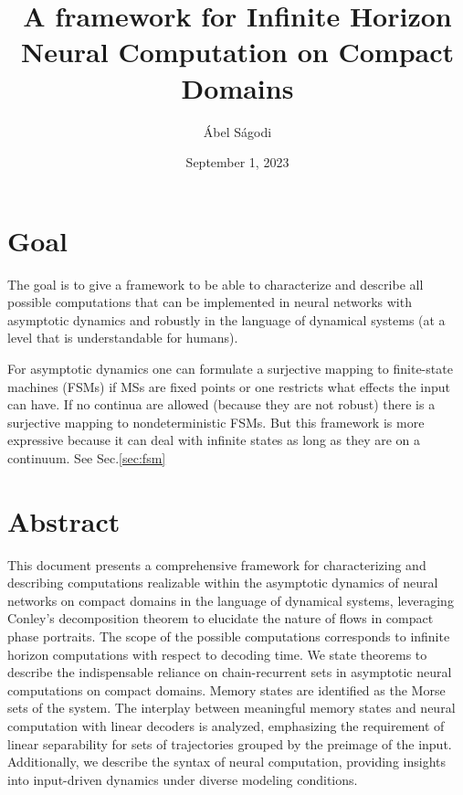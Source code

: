\documentclass{scrartcl}
\title{A framework for Infinite Horizon Neural Computation on Compact Domains}
\author{\'Abel S\'agodi}
\date{September 1, 2023}
\theoremstyle{definition}
\theoremstyle{remark}
\begin{document}
\maketitle


\section*{Goal}
The goal is to give a framework to be able to characterize and describe all possible computations that can be implemented in neural networks with asymptotic dynamics and robustly in the language of dynamical systems (at a level that is understandable for humans).

For asymptotic dynamics one can formulate a surjective mapping to finite-state machines (FSMs) if MSs are fixed points or one restricts what effects the input can have.
If no continua are allowed (because they are not robust) there is a surjective mapping to nondeterministic FSMs. 
But this framework is more expressive because it can deal with infinite states as long as they are on a continuum.
See Sec.\ref{sec:fsm}

\section*{Abstract}
This document presents a comprehensive framework for characterizing and describing computations realizable within the asymptotic dynamics of neural networks on compact domains in the language of dynamical systems,  leveraging Conley's decomposition theorem to elucidate the nature of flows in compact phase portraits. The scope of the possible computations corresponds to infinite horizon computations with respect to decoding time. We state theorems to describe the indispensable reliance on chain-recurrent sets in asymptotic neural computations on compact domains. Memory states are identified as the Morse sets of the system. The interplay between meaningful memory states and neural computation with linear decoders is analyzed, emphasizing the requirement of linear separability for sets of trajectories grouped by the preimage of the input. 
Additionally, we describe the syntax of neural computation, providing insights into input-driven dynamics under diverse modeling conditions. 

\newpage
\end{document}
